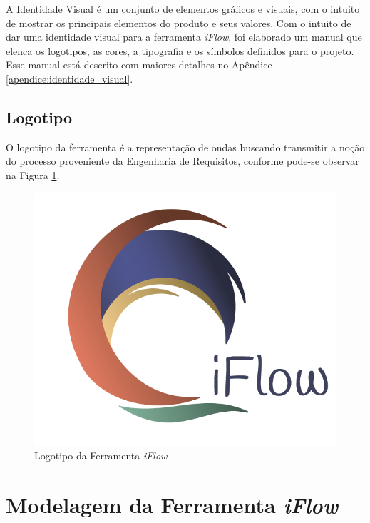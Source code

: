 \label{sec:identidade_visual}

A Identidade Visual é um conjunto de elementos gráficos e visuais, com o intuito de mostrar os principais elementos do produto e seus valores. Com o intuito de dar uma identidade visual para a ferramenta \textit{iFlow}, foi elaborado um manual que elenca os logotipos, as cores, a tipografia e os símbolos definidos para o projeto. Esse manual está descrito com maiores detalhes no Apêndice \ref{apendice:identidade_visual}.

\subsection{Logotipo}
O logotipo da ferramenta é a representação de ondas buscando transmitir a noção do processo proveniente da Engenharia de Requisitos, conforme pode-se observar na Figura \ref{fig:logotipo}.

\begin{figure}[]
    \begin{center}
        \caption{{Logotipo da Ferramenta \textit{iFlow}}}
        \label{fig:logotipo}
        \includegraphics[scale=1.0]{figuras/Proposta/logotipo.png}
    \end{center}
\end{figure}

\section{Modelagem da Ferramenta \textit{iFlow}}

